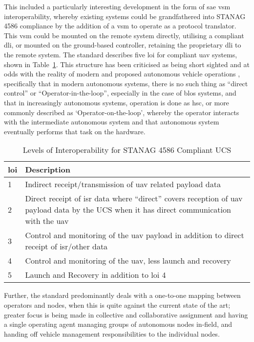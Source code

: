 This included a particularly interesting development in the form of \gls{sae} \gls{vsm} interoperability, whereby existing systems could be grandfathered into STANAG 4586 compliance by the addition of a \gls{vsm} to operate as a protocol translator.
This \gls{vsm} could be mounted on the remote system directly, utilising a compliant \gls{dli}, or mounted on the ground-based controller, retaining the proprietary \gls{dli} to the remote system.
The standard describes five \acrfull{loi} for compliant \gls{uav} systems, shown in Table~\ref{tab:levels_of_interoperability}.
This structure has been criticised as being short sighted and at odds with the reality of modern and proposed autonomous vehicle operations \cite{Cummings2010}, specifically that in modern autonomous systems, there is no such thing as ``direct control'' or ``Operator-in-the-loop'', especially in the case of \gls{blos} systems, and that in increasingly autonomous systems, operation is done as \gls{hsc}, or more commonly described as ‘Operator-on-the-loop’, whereby the operator interacts with the intermediate autonomous system and that autonomous system eventually performs that task on the hardware.

\begin{table}
  \begin{tabularx}{\textwidth}{lX}
    \toprule
    \gls{loi} &  Description\\ \midrule
    1 &  Indirect receipt/transmission of \gls{uav} related payload data\\ 
    2 &  Direct receipt of \gls{isr} data where “direct” covers reception of \gls{uav} payload data by the UCS when it has direct communication with the \gls{uav}\\ 
    3 &  Control and monitoring of the \gls{uav} payload in addition to direct receipt of \gls{isr}/other data\\ 
    4 &  Control and monitoring of the \gls{uav}, less launch and recovery\\
    5 &  Launch and Recovery in addition to \gls{loi} 4\\ 
    \bottomrule 
  \end{tabularx}
  \caption[\gls{loi} for STANAG 4586 Compliant UCS]{Levels of Interoperability for STANAG 4586 Compliant UCS \cite{STANAG4586}}
  \label{tab:levels_of_interoperability}
\end{table}

Further, the standard predominantly deals with a one-to-one mapping between operators and nodes, when this is quite against the current state of the art; greater focus is being made in collective and collaborative assignment and having a single operating agent managing groups of autonomous nodes in-field, and handing off vehicle management responsibilities to the individual nodes.

